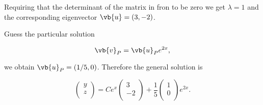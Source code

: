 \documentclass[english,a4paper,12pt]{report}
\begin{document}
{Requiring that the determinant of the matrix in fron to be zero we get \(\lambda =1\) and the corresponding eigenvector \(\vb{u} = (3,-2)\). 

Guess the particular solution 

\begin{equation}
    \vb{v} _{P} = \vb{u} _{P} e^{2x}, 
\end{equation}

we obtain \(\vb{u} _{P} = (1/5,0) \). Therefore the general solution is 

\begin{equation}
    \begin{pmatrix}
         y \\
         z \\
    \end{pmatrix}= Ce^{x} \begin{pmatrix}
         3 \\
         -2 \\
    \end{pmatrix} + \frac{1}{5} \begin{pmatrix}
         1 \\
         0 \\
    \end{pmatrix} e^{2x}.  
\end{equation}
~
} 
\end{document}
